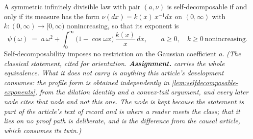 \begin{proposition}\label{prop:sd-exponents}
\notready
{}
A symmetric infinitely divisible law with pair $(a,\nu)$ is self-decomposable if and only if
its \Levy{} measure has the form $\nu(dx) = k(x)\,x^{-1}dx$ on $(0,\infty)$ with
$k : (0,\infty) \to [0,\infty)$ nonincreasing, so that its exponent is
\begin{equation}\label{eq:sd-profile}
  \psi(\omega) \;=\; a\,\omega^2
  + \int_0^\infty \bigl(1 - \cos\omega x\bigr)\,\frac{k(x)}{x}\,dx,
  \qquad a \ge 0, \quad k \ge 0 \ \text{nonincreasing}.
\end{equation}
Self-decomposability imposes no restriction on the Gaussian coefficient $a$.
\statusA\quad{}\quad\emph{(The classical statement, cited for orientation.
\textbf{Assignment.}  carries the whole equivalence. What it does not carry is
anything this article's development consumes: the profile form is obtained independently in
\ref{lem:selfdecomposable-exponents}, from the dilation identity and a convex-tail argument,
and every later node cites that node and not this one. The node is kept because the statement
is part of the article's text of record and is where a reader meets the class; that it lies on
no proof path is deliberate, and is the difference from the causal article, which consumes
its twin.)}
\end{proposition}

